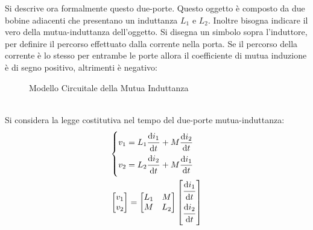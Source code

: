 \documentclass{article}
\newcommand{\df}{\mathrm{d}}
\numberwithin{equation}{subsection}
\begin{document}
Si descrive ora formalmente questo due-porte. Questo oggetto è composto da due bobine adiacenti che presentano un induttanza $L_1$ e $L_2$. Inoltre 
bisogna indicare il vero della mutua-induttanza dell'oggetto. Si disegna un simbolo sopra l'induttore, per definire il percorso effettuato dalla corrente nella porta. 
Se il percorso della corrente è lo stesso per entrambe le porte allora il coefficiente di mutua induzione è di segno positivo, altrimenti è negativo:
\begin{figure}[ht]%
    \centering
    \qquad
    \caption{Modello Circuitale della Mutua Induttanza}
    \label{fig:mutua-induttanza}
\end{figure}
\\
Si considera la legge costitutiva nel tempo del due-porte mutua-induttanza:
\begin{gather*}
    \begin{cases}
        v_1=L_1\displaystyle\frac{\strut \df i_1}{\strut \df t}+M\frac{\df i_2}{\df t}\\
        v_2=L_2\displaystyle\frac{\strut \df i_2}{\strut \df t}+M\frac{\df i_1}{\df t}
    \end{cases}\\
    \begin{bmatrix}
        v_1\\v_2
    \end{bmatrix}=\begin{bmatrix}
        L_1&M\\M&L_2
    \end{bmatrix}\begin{bmatrix}
        \displaystyle\frac{\strut \df i_1}{\strut \df t}\\ \displaystyle\frac{\strut \df i_2}{\strut \df t}
    \end{bmatrix}
\end{gather*}
\end{document}
